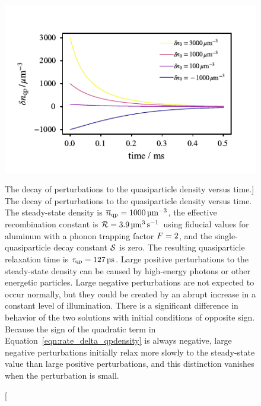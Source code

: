 \begin{figure}[htb]
\centering
\includegraphics[width=\textwidth]{theory/delta_qpdensity_versus_time.pdf}
\caption
[The decay of perturbations to the quasiparticle density versus time.]
{The decay of perturbations to the quasiparticle density versus time.
The steady-state density is
$\overline{n}_{\mathrm{qp}} = \SI{1000}{\micro\meter^{-3}}$,
the effective recombination constant is
$\mathcal{R} = \SI{3.9}{\micro\meter^{3}.s^{-1}}$
using fiducial values for aluminum with a phonon trapping factor
$F = 2$,
and the single-quasiparticle decay constant $\mathcal{S}$ is zero.
The resulting quasiparticle relaxation time is
$\tau_{\mathrm{qp}} = \SI{127}{\micro\second}$.
Large positive perturbations to the steady-state density can be caused by high-energy photons or other energetic particles.
Large negative perturbations are not expected to occur normally, but they could be created by an abrupt increase in a constant level of illumination.
There is a significant difference in behavior of the two solutions with initial conditions of opposite sign.
Because the sign of the quadratic term in Equation~\ref{eqn:rate_delta_qpdensity} is always negative, large negative perturbations initially relax more slowly to the steady-state value than large positive perturbations, and this distinction vanishes when the perturbation is small.
}
\label{fig:delta_qpdensity_versus_time}
\end{figure}

